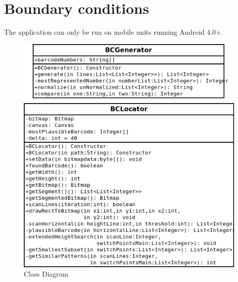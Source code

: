 \documentclass{report}
\begin{document}
\section{Boundary conditions}
The application can only be run on mobile units running Android 4.0+.




\appendix

\pagebreak

\begin{figure}[H]
		\centering
		\includegraphics[width=\textwidth]{classdiagramcore.png}
		\caption{Class Diagram}
		\label{fig:Class Diagram for Core package.}
\end{figure}
\end{document}
